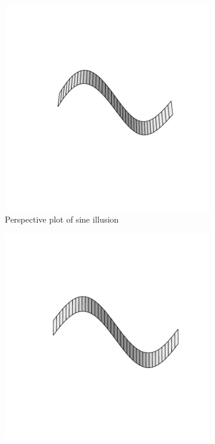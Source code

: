 \documentclass[11pt]{isuthesis}\usepackage[]{graphicx}\usepackage[]{color}
\begin{document}
\begin{figure}[h!tbp]\centering


\begin{subfigure}[t]{.49\textwidth}\centering
\includegraphics[width=\textwidth, keepaspectratio=TRUE, trim=0in 1.5in 0in 1.5in]{fig-ribbon-illusion1}
\caption{Perspective plot of sine illusion\label{ribbon1}}
\end{subfigure}
\begin{subfigure}[t]{.49\textwidth}\centering
\includegraphics[width=\textwidth, keepaspectratio=TRUE, trim=0in 1.5in 0in 1.5in]{fig-ribbon-illusion2}

\end{subfigure}
\end{figure}
\end{document}
